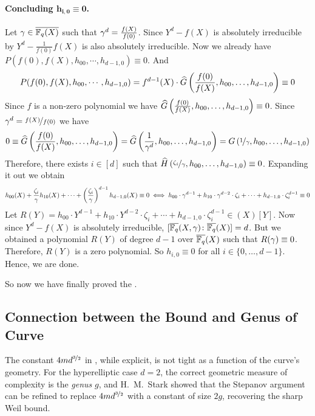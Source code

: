 \paragraph*{Concluding $\bm{h_{i,0}\equiv 0}$.} Let $\gamma\in\overline{\mathbb{F}_q(X)}$ such that $\gamma^d=\frac{f(X)}{f(0)}$. Since $Y^d-f(X)$ is absolutely irreducible by \YdFxIrrthm $Y^d-\frac1{f(0)}f(X)$ is also absolutely irreducible. Now we already have $P(f(0),f(X),h_{00},\cdots, h_{d-1,0})\equiv 0$. And $$P(f(0),f(X),h_{00},\cdots, h_{d-1,0})=f^{d-1}(X)\cdot \widehat{G}\left(\frac{f(0)}{f(X)},h_{00},\dots, h_{d-1,0}  \right)\equiv 0$$Since $f$ is a non-zero polynomial we have $\widehat{G}\left(\frac{f(0)}{f(X)},h_{00},\dots, h_{d-1,0}  \right)\equiv 0$. Since $\gamma^d=\nicefrac{f(X)}{f(0)}$ we have 
\begin{equation}\label{eq:stepanov-g-zero}
  0\equiv \widehat{G}\left(\frac{f(0)}{f(X)},h_{00},\dots, h_{d-1,0}\right)= \widehat{G}\left(\frac1{\gamma^d},h_{00},\dots, h_{d-1,0}\right)=G\left(\nicefrac1{\gamma},h_{00},\dots, h_{d-1,0}\right)
\end{equation}
Therefore, there exists $i\in [d]$ such that $\widehat{H}\left(\nicefrac{\zeta_i}{\gamma},h_{00},\dots, h_{d-1,0}\right)\equiv 0$. Expanding it out we obtain $$h_{00}(X)+\frac{\zeta_i}{\gamma}h_{10}(X)+\cdots +\left(\frac{\zeta_i}{\gamma}\right)^{d-1}h_{d-1,0}(X)\equiv 0\iff h_{00}\cdot \gamma^{d-1}+h_{10}\cdot \gamma^{d-2}\cdot \zeta_i+\cdots +h_{d-1,0}\cdot \zeta_i^{d-1}\equiv 0$$ Let $R(Y)=h_{00}\cdot Y^{d-1}+h_{10}\cdot Y^{d-2}\cdot \zeta_i+\cdots +h_{d-1,0}\cdot \zeta_i^{d-1}\in(X)[Y]$. Now since $Y^d-f(X)$ is absolutely irreducible, $[\overline{\mathbb{F}_q}(X,\gamma)\colon\overline{\mathbb{F}_q}(X)]=d$. But we obtained a polynomial $R(Y)$ of degree $d-1$ over $\overline{\mathbb{F}_q}(X)$ such that $R(\gamma)\equiv 0$. Therefore, $R(Y)$ is a zero polynomial. So $h_{i,0}\equiv 0$ for all $i\in\{0,\dots, d-1\}$. Hence, we are done. 

So now we have finally proved the \Stepanov.

\subsection{Connection between the Bound and Genus of Curve}

The constant $4md^{\nicefrac32}$ in \Stepanov, while explicit, is not tight as a function of the curve's geometry. For the hyperelliptic case $d=2$, the correct geometric measure of complexity is the \emph{genus} $g$, and H.\ M.\ Stark \cite{Stark_1973_RiemannHyperelliptic} showed that the Stepanov argument can be refined to replace $4md^{\nicefrac32}$ with a constant of size $2g$, recovering the sharp Weil bound.


